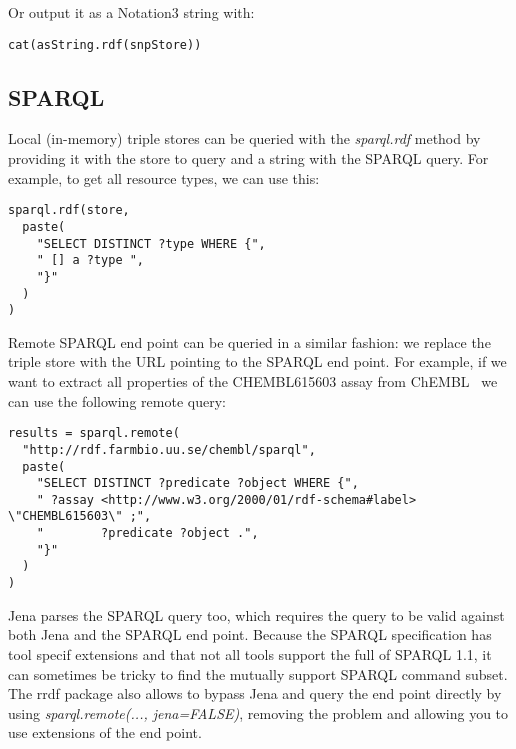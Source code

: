 \documentclass[12pt]{article}
\begin{document}
Or output it as a Notation3 string with:

\begin{footnotesize}
\begin{verbatim}
cat(asString.rdf(snpStore))
\end{verbatim}
\end{footnotesize}

\subsection{SPARQL}

Local (in-memory) triple stores can be queried with the \emph{sparql.rdf} method by providing
it with the store to query and a string with the SPARQL query. For example, to get all resource
types, we can use this:

\begin{footnotesize}
\begin{verbatim}
sparql.rdf(store,
  paste(
    "SELECT DISTINCT ?type WHERE {",
    " [] a ?type ",
    "}"
  )
) 
\end{verbatim}
\end{footnotesize}

Remote SPARQL end point can be queried in a similar fashion: we replace the triple store with the
URL pointing to the SPARQL end point. For example, if we want to
extract all properties of the CHEMBL615603 assay from ChEMBL~\cite{Gaulton2012,Willighagen2013}
we can use the following remote query:

\begin{footnotesize}
\begin{verbatim}
results = sparql.remote(
  "http://rdf.farmbio.uu.se/chembl/sparql",
  paste(
    "SELECT DISTINCT ?predicate ?object WHERE {",
    " ?assay <http://www.w3.org/2000/01/rdf-schema#label> \"CHEMBL615603\" ;",
    "        ?predicate ?object .",
    "}"
  )
) 
\end{verbatim}
\end{footnotesize}

Jena parses the SPARQL query too, which requires the query to be valid
against both Jena and the SPARQL end point. Because the SPARQL specification has tool specif
extensions and that not all tools support the full of SPARQL 1.1, it can sometimes be tricky
to find the mutually support SPARQL command subset. The rrdf package also allows to bypass
Jena and query the end point directly by using \emph{sparql.remote(..., jena=FALSE)},
removing the problem and allowing you to use extensions of the end point.
\end{document}
